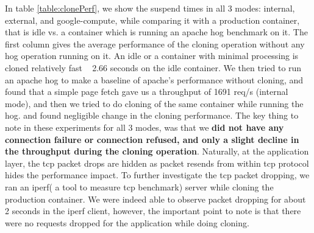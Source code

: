 In table \ref {table:clonePerf}, we show the suspend times in all 3 modes: internal, external, and google-compute, while comparing it with a production container, that is idle vs. a container which is running an apache hog benchmark \cite{httperf} on it. 
The first column gives the average performance of the cloning operation without any hog operation running on it.  
An idle or a container with minimal processing is cloned relatively fast ~ 2.66 seconds on the idle container. 
We then tried to run an apache hog to make a baseline of apache's performance without cloning, and found that a simple page fetch gave us a throughput of 1691 req/s (internal mode), and then we tried to do cloning of the same container while running the hog. and found negligible change in the cloning performance.
The key thing to note in these experiments for all 3 modes, was that we \textbf{did not have any connection failure or connection refused, and only a slight decline in the throughput during the cloning operation}. 
Naturally, at the application layer, the tcp packet drops are hidden as packet resends from within tcp protocol hides the performance impact.
To further investigate the tcp packet dropping, we ran an iperf\cite{iperf}( a tool to measure tcp benchmark) server while cloning the production container. 
We were indeed able to observe packet dropping for about 2 seconds in the iperf client, however, the important point to note is that there were no requests dropped for the application while doing cloning. 

